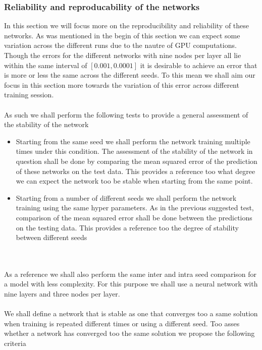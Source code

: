 \documentclass[12pt]{article}
\begin{document}
\subsubsection{Reliability and reproducability of the networks}

In this section we will focus more on the reproducibility and reliability of these networks. As was mentioned in the begin of this section we can expect some variation across the different runs due to the nautre of GPU computations. Though the errors for the different networks with nine nodes per layer all lie within the same interval of $[0.001, 0.0001]$ it is desirable to achieve an error that is more or less the same across the different seeds. To this mean we shall aim our focus in this section more towards the variation of this error across different training session.
\\
\\
As such we shall perform the following tests to provide a general assessment of the stability of the network
\begin{itemize}
	\item Starting from the same seed we shall perform the network training multiple times under this condition. The assessment of the stability of the network in question shall be done by comparing the mean squared error of the prediction of these networks on the test data. This provides a reference too what degree we can expect the network too be stable when starting from the same point.
	\item Starting from a number of different seeds we shall perform the network training using the same hyper parameters. As in the previous suggested test, comparison of the mean squared error shall be done between the predictions on the testing data. This provides a reference too the degree of stability between different seeds 
\end{itemize}
\\
\\
As a reference we shall also perform the same inter and intra seed comparison for a model with less complexity. For this purpose we shall use a neural network with nine layers and three nodes per layer.
\\
\\
We shall define a network that is stable as one that converges too a same solution when training is repeated different times or using a different seed. Too asses whether a network has converged too the same solution we propose the following criteria
\end{document}
